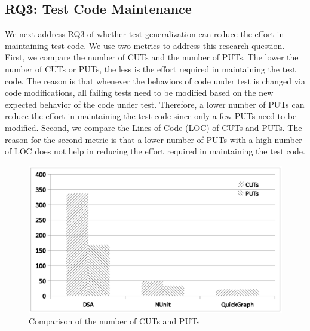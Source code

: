 \subsection{RQ3: Test Code Maintenance}

We next address RQ3 of whether test generalization can reduce the effort in maintaining test code. We use two metrics to address this research question. First, we compare the number of CUTs and the number of PUTs. The lower the number of CUTs or PUTs, the less is the effort required in maintaining the test code. The reason is that whenever the behaviors of code under test is changed via code modifications, all failing tests need to be modified based on the new expected behavior of the code under test. Therefore, a lower number of PUTs can reduce the effort in maintaining the test code since only a few PUTs need to be modified. Second, we compare the Lines of Code (LOC) of CUTs and PUTs. The reason for the second metric is that a lower number of PUTs with a high number of LOC does not help in reducing the effort required in maintaining the test code.

\begin{figure}[t]
\centering
\includegraphics[scale=0.60,clip,trim=200 200 00 150]{charts/CUTs_PUTs_1.eps}\vspace*{-3ex}
\caption{\label{fig:cutsnputs}Comparison of the number of CUTs and PUTs} \vspace*{-2ex}
\end{figure}

